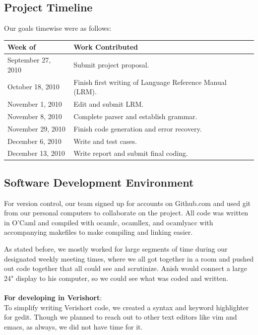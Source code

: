 \documentclass[letterpaper,11pt]{article}
\begin{document}
    \subsection{Project Timeline}
    	Our goals timewise were as follows:
	\begin{center} 
    \begin{tabular}{|l|p{4in}|} \hline
    Week of&Work Contributed\\ \hline
    September 27, 2010 & Submit project proposal. \\
    October 18, 2010 & Finish first writing of Language Reference Manual (LRM). \\
    November 1, 2010 & Edit and submit LRM.  \\
    November 8, 2010 & Complete parser and establish grammar.  \\ %
    November 29, 2010 & Finish code generation and error recovery. \\ %
    December 6, 2010 & Write and test cases. \\ %
    December 13, 2010 & Write report and submit final coding. \\ \hline %
    \end{tabular}
    \end{center}
    
    \subsection{Software Development Environment}
    For version control, our team signed up for accounts on Github.com and used git from our 
    personal computers to collaborate on the project. All code was written in O'Caml and compiled with ocamlc, ocamllex,
    and ocamlyacc with accompanying makefiles to make compiling and linking easier.  
    
    As stated before, we mostly worked for large segments of time during our designated weekly meeting times, where we all 
    got together in a room and pushed out code together that all could see and scrutinize. Anish would connect a large
    24" display to his computer, so we could see what was coded and written.\\\\
    \textbf{For developing in Verishort}:\\
    To simplify writing Verishort code, we created a syntax and keyword highlighter for gedit. Though we planned to reach
    out to other text editors like vim and emacs, as always, we did not have time for it.
    
\end{document}

